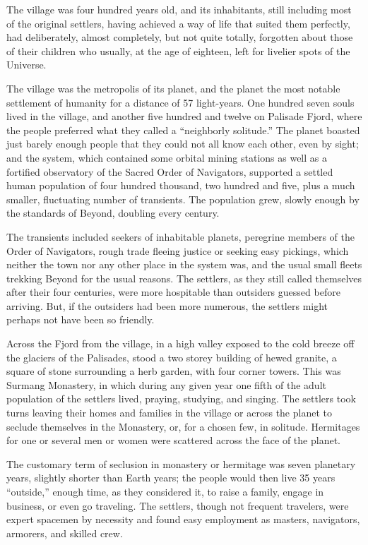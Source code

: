 \documentclass[english,11pt,letterpaper,onecolumn]{scrbook}
\begin{document}
	The village was four hundred years old, and its inhabitants, still including most of the original settlers, having achieved a way of life that suited them perfectly, had deliberately, almost completely, but not quite totally, forgotten about those of their children who usually, at the age of eighteen, left for livelier spots of the Universe.

	The village was the metropolis of its planet, and the planet the most notable settlement of humanity for a distance of 57 light-years. One hundred seven souls lived in the village, and another five hundred and twelve on Palisade Fjord, where the people preferred what they called a ``neighborly solitude.'' The planet boasted just barely enough people that they could not all know each other, even by sight; and the system, which contained some orbital mining stations as well as a fortified observatory of the Sacred Order of Navigators, supported a settled human population of four hundred thousand, two hundred and five, plus a much smaller, fluctuating number of transients. The population grew, slowly enough by the standards of Beyond, doubling every century.

	The transients included seekers of inhabitable planets, peregrine members of the Order of Navigators, rough trade fleeing justice or seeking easy pickings, which neither the town nor any other place in the system was, and the usual small fleets trekking Beyond for the usual reasons. The settlers, as they still called themselves after their four centuries, were more hospitable than outsiders guessed before arriving.  But, if the outsiders had been more numerous, the settlers might perhaps not have been so friendly.

	Across the Fjord from the village, in a high valley exposed to the cold breeze off the glaciers of the Palisades, stood a two storey building of hewed granite, a square of stone surrounding a herb garden, with four corner towers. This was Surmang Monastery, in which during any given year one fifth of the adult population of the settlers lived, praying, studying, and singing. The settlers took turns leaving their homes and families in the village or across the planet to seclude themselves in the Monastery, or, for a chosen few, in solitude.  Hermitages for one or several men or women were scattered across the face of the planet.

	The customary term of seclusion in monastery or hermitage was seven planetary years, slightly shorter than Earth years; the people would then live 35 years ``outside,'' enough time, as they considered it, to raise a family, engage in business, or even go traveling. The settlers, though not frequent travelers, were expert spacemen by necessity and found easy employment as masters, navigators, armorers, and skilled crew.
\end{document}
